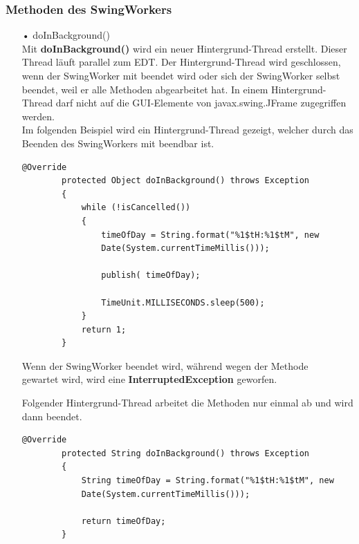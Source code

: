 \subsubsection{Methoden des SwingWorkers}
\begin{itemize}
\item[•] doInBackground()
\\ Mit \textbf{doInBackground()} wird ein neuer Hintergrund-Thread erstellt. Dieser Thread läuft parallel zum \ac{EDT}. Der Hintergrund-Thread wird geschlossen, wenn der SwingWorker mit  beendet wird oder sich der SwingWorker selbst beendet, weil er alle Methoden abgearbeitet hat. In einem Hintergrund-Thread darf nicht auf die GUI-Elemente von javax.swing.JFrame zugegriffen werden. 
\\ Im folgenden Beispiel wird ein Hintergrund-Thread gezeigt, welcher durch das Beenden des SwingWorkers mit  beendbar ist.
\begin{lstlisting}[style=JavaStyle, caption=SwingWorker \inlinecode{JavaStyle}{doInBackground()} mit while Schleife]
	    @Override
        protected Object doInBackground() throws Exception
        {
            while (!isCancelled())
            {
                timeOfDay = String.format("%1$tH:%1$tM", new
                Date(System.currentTimeMillis()));

                publish( timeOfDay);

                TimeUnit.MILLISECONDS.sleep(500);
            }
            return 1;
        }
\end{lstlisting} 
Wenn der SwingWorker beendet wird, während wegen der Methode \\  gewartet wird, wird eine \textbf{InterruptedException} geworfen.

\vspace{10pt}

Folgender Hintergrund-Thread arbeitet die Methoden nur einmal ab und wird dann beendet. 
\begin{lstlisting}[style=JavaStyle, caption=SwingWorker \inlinecode{JavaStyle}{doInBackground()} ohne while Schleife, label=SwingWorkerOhneWhileSchleife]
	    @Override
        protected String doInBackground() throws Exception
        {
            String timeOfDay = String.format("%1$tH:%1$tM", new 
            Date(System.currentTimeMillis()));
            
            return timeOfDay;
        }
\end{lstlisting} 


\end{itemize}
